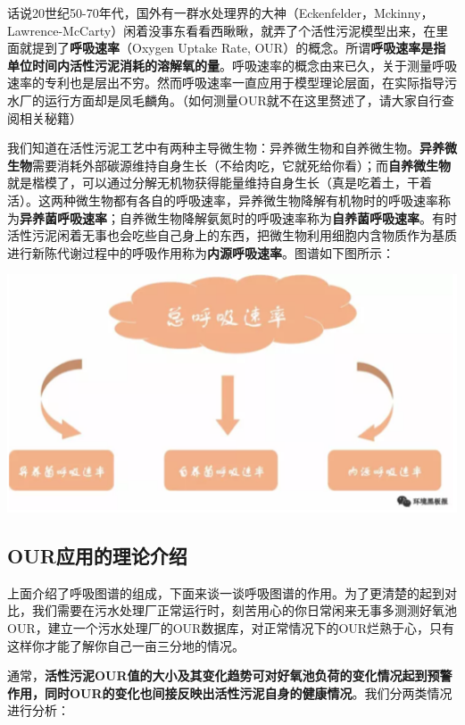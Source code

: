 \documentclass[]{book}
\begin{document}
话说20世纪50-70年代，国外有一群水处理界的大神（Eckenfelder，Mckinny，Lawrence-McCarty）闲着没事东看看西瞅瞅，就弄了个活性污泥模型出来，在里面就提到了\textbf{呼吸速率}（Oxygen Uptake Rate, OUR）的概念。所谓\textbf{呼吸速率是指单位时间内活性污泥消耗的溶解氧的量}。呼吸速率的概念由来已久，关于测量呼吸速率的专利也是层出不穷。然而呼吸速率一直应用于模型理论层面，在实际指导污水厂的运行方面却是凤毛麟角。（如何测量OUR就不在这里赘述了，请大家自行查阅相关秘籍）

我们知道在活性污泥工艺中有两种主导微生物：异养微生物和自养微生物。\textbf{异养微生物}需要消耗外部碳源维持自身生长（不给肉吃，它就死给你看）；而\textbf{自养微生物}就是楷模了，可以通过分解无机物获得能量维持自身生长（真是吃着土，干着活）。这两种微生物都有各自的呼吸速率，异养微生物降解有机物时的呼吸速率称为\textbf{异养菌呼吸速率}；自养微生物降解氨氮时的呼吸速率称为\textbf{自养菌呼吸速率}。有时活性污泥闲着无事也会吃些自己身上的东西，把微生物利用细胞内含物质作为基质进行新陈代谢过程中的呼吸作用称为\textbf{内源呼吸速率}。图谱如下图所示：

\includegraphics[width=6.67in]{images/os2}

\hypertarget{ourux5e94ux7528ux7684ux7406ux8bbaux4ecbux7ecd}{%
\subsection{OUR应用的理论介绍}\label{ourux5e94ux7528ux7684ux7406ux8bbaux4ecbux7ecd}}

上面介绍了呼吸图谱的组成，下面来谈一谈呼吸图谱的作用。为了更清楚的起到对比，我们需要在污水处理厂正常运行时，刻苦用心的你日常闲来无事多测测好氧池OUR，建立一个污水处理厂的OUR数据库，对正常情况下的OUR烂熟于心，只有这样你才能了解你自己一亩三分地的情况。

通常，\textbf{活性污泥OUR值的大小及其变化趋势可对好氧池负荷的变化情况起到预警作用，同时OUR的变化也间接反映出活性污泥自身的健康情况}。我们分两类情况进行分析：
\end{document}

